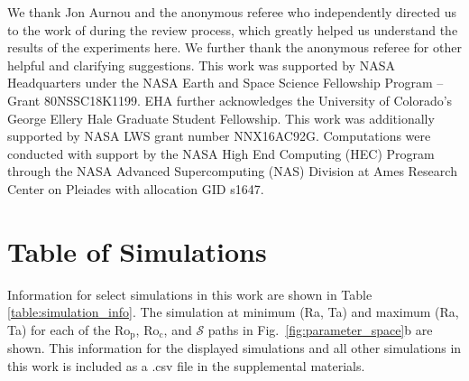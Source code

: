 \documentclass[twocolumn, amsmath, amsfonts, amssymb, trackchanges]{aastex62}
\newcommand{\pro}{\ensuremath{\text{Ro}_{\text{p}}}}
\newcommand{\con}{\ensuremath{\text{Ro}_{\text{c}}}}
\begin{document}
\begin{acknowledgements}
We thank Jon Aurnou and the anonymous referee who independently directed
us to the work of \citet{king&all2012} during the review process, which greatly
helped us understand the results of the experiments here. We further thank
the anonymous referee for other helpful and clarifying suggestions.
This work was supported by NASA Headquarters under the NASA Earth and Space
Science Fellowship Program -- Grant 80NSSC18K1199.
EHA further acknowledges the University of Colorado's George 
Ellery Hale Graduate Student Fellowship.
This work was additionally supported by  NASA LWS grant number NNX16AC92G.  
Computations were conducted 
with support by the NASA High End Computing (HEC) Program through the NASA 
Advanced Supercomputing (NAS) Division at Ames Research Center on Pleiades
with allocation GID s1647.
\end{acknowledgements}


\appendix
\section{Table of Simulations}
\label{appendix:table}
Information for select simulations in this work are shown in Table \ref{table:simulation_info}.
The simulation at minimum (Ra, Ta) and maximum (Ra, Ta) for each of the \pro, \con, and $\mathcal{S}$
paths in Fig.~\ref{fig:parameter_space}b are shown. This information for the displayed simulations
and all other simulations in this work is included as a .csv file in the supplemental materials.
\end{document}

